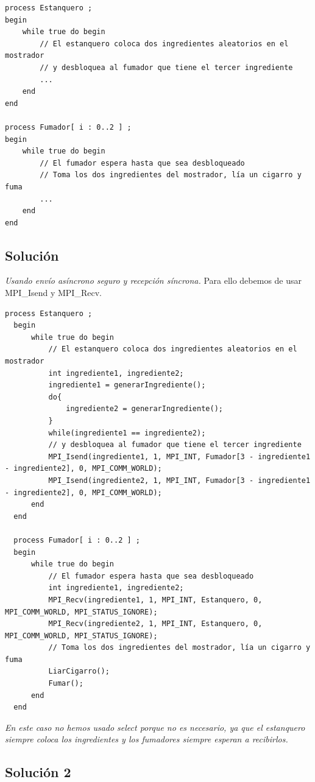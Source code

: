 \documentclass[a4paper,12pt]{article}
\begin{document}
\begin{lstlisting}[style=customcpp]
process Estanquero ;
begin
    while true do begin
        // El estanquero coloca dos ingredientes aleatorios en el mostrador
        // y desbloquea al fumador que tiene el tercer ingrediente
        ...
    end
end

process Fumador[ i : 0..2 ] ;
begin
    while true do begin
        // El fumador espera hasta que sea desbloqueado
        // Toma los dos ingredientes del mostrador, lía un cigarro y fuma
        ...
    end
end
\end{lstlisting}

\subsection{Solución}

\textit{Usando envío asíncrono seguro y recepción síncrona.} Para ello debemos de usar MPI\_Isend y MPI\_Recv.

\begin{lstlisting}[style=customcpp]
  process Estanquero ;
  begin
      while true do begin
          // El estanquero coloca dos ingredientes aleatorios en el mostrador
          int ingrediente1, ingrediente2;
          ingrediente1 = generarIngrediente();
          do{
              ingrediente2 = generarIngrediente();
          }
          while(ingrediente1 == ingrediente2);
          // y desbloquea al fumador que tiene el tercer ingrediente
          MPI_Isend(ingrediente1, 1, MPI_INT, Fumador[3 - ingrediente1 - ingrediente2], 0, MPI_COMM_WORLD);
          MPI_Isend(ingrediente2, 1, MPI_INT, Fumador[3 - ingrediente1 - ingrediente2], 0, MPI_COMM_WORLD);
      end
  end
  
  process Fumador[ i : 0..2 ] ;
  begin
      while true do begin
          // El fumador espera hasta que sea desbloqueado
          int ingrediente1, ingrediente2;
          MPI_Recv(ingrediente1, 1, MPI_INT, Estanquero, 0, MPI_COMM_WORLD, MPI_STATUS_IGNORE);
          MPI_Recv(ingrediente2, 1, MPI_INT, Estanquero, 0, MPI_COMM_WORLD, MPI_STATUS_IGNORE);
          // Toma los dos ingredientes del mostrador, lía un cigarro y fuma
          LiarCigarro();
          Fumar();
      end
  end
\end{lstlisting}

\textit{En este caso no hemos usado select porque no es necesario, ya que el estanquero siempre coloca los ingredientes y los fumadores siempre esperan a recibirlos.}

\subsection{Solución 2}
\end{document}
